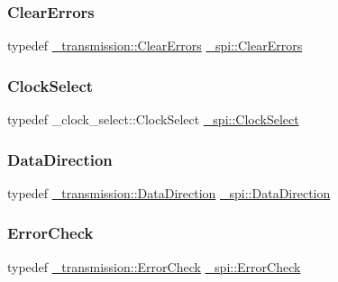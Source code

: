 \subsubsection{\texorpdfstring{Clear\+Errors}{ClearErrors}}
{\footnotesize\ttfamily typedef \hyperlink{class__transmission_1_1ClearErrors}{\+\_\+transmission\+::\+Clear\+Errors} \hyperlink{namespace__spi_a7f84bc62e06fdda021c42411ad8eee2a}{\+\_\+spi\+::\+Clear\+Errors}}

\hypertarget{namespace__spi_af65fa4a6f5d6ab0ac870066fdf89cccb}{}\label{namespace__spi_af65fa4a6f5d6ab0ac870066fdf89cccb} 
\subsubsection{\texorpdfstring{Clock\+Select}{ClockSelect}}
{\footnotesize\ttfamily typedef \+\_\+clock\+\_\+select\+::\+Clock\+Select \hyperlink{namespace__spi_af65fa4a6f5d6ab0ac870066fdf89cccb}{\+\_\+spi\+::\+Clock\+Select}}

\hypertarget{namespace__spi_ac38499e87a8df9fd49f1becb09f847d2}{}\label{namespace__spi_ac38499e87a8df9fd49f1becb09f847d2} 
\subsubsection{\texorpdfstring{Data\+Direction}{DataDirection}}
{\footnotesize\ttfamily typedef \hyperlink{namespace__transmission_a49a33659d7c6abcf7f0180cd7e34fa0e}{\+\_\+transmission\+::\+Data\+Direction} \hyperlink{namespace__transmission_a49a33659d7c6abcf7f0180cd7e34fa0e}{\+\_\+spi\+::\+Data\+Direction}}

\hypertarget{namespace__spi_aa004e3fbc2eb239fc900cb843aad51a2}{}\label{namespace__spi_aa004e3fbc2eb239fc900cb843aad51a2} 
\subsubsection{\texorpdfstring{Error\+Check}{ErrorCheck}}
{\footnotesize\ttfamily typedef \hyperlink{namespace__transmission_aea6508744dac6029815eb3aac4affda8}{\+\_\+transmission\+::\+Error\+Check} \hyperlink{namespace__transmission_aea6508744dac6029815eb3aac4affda8}{\+\_\+spi\+::\+Error\+Check}}

